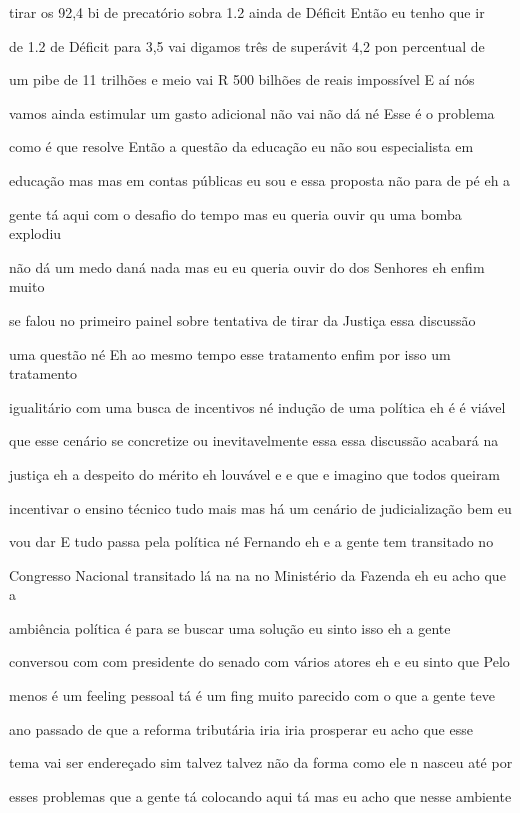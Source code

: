 \documentclass[a4paper,12pt]{article}
\begin{document}
tirar os 92,4 bi de precatório sobra 1.2 ainda de Déficit Então eu tenho que ir

de 1.2 de Déficit para 3,5 vai digamos três de superávit 4,2 pon percentual de

um pibe de 11 trilhões e meio vai R 500 bilhões de reais impossível E aí nós

vamos ainda estimular um gasto adicional não vai não dá né Esse é o problema

como é que resolve Então a questão da educação eu não sou especialista em

educação mas mas em contas públicas eu sou e essa proposta não para de pé eh a

gente tá aqui com o desafio do tempo mas eu queria ouvir qu uma bomba explodiu

não dá um medo daná nada mas eu eu queria ouvir do dos Senhores eh enfim muito

se falou no primeiro painel sobre tentativa de tirar da Justiça essa discussão

uma questão né Eh ao mesmo tempo esse tratamento enfim por isso um tratamento

igualitário com uma busca de incentivos né indução de uma política eh é é viável

que esse cenário se concretize ou inevitavelmente essa essa discussão acabará na

justiça eh a despeito do mérito eh louvável e e que e imagino que todos queiram

incentivar o ensino técnico tudo mais mas há um cenário de judicialização bem eu

vou dar E tudo passa pela política né Fernando eh e a gente tem transitado no

Congresso Nacional transitado lá na na no Ministério da Fazenda eh eu acho que a

ambiência política é para se buscar uma solução eu sinto isso eh a gente

conversou com com presidente do senado com vários atores eh e eu sinto que Pelo

menos é um feeling pessoal tá é um fing muito parecido com o que a gente teve

ano passado de que a reforma tributária iria iria prosperar eu acho que esse

tema vai ser endereçado sim talvez talvez não da forma como ele n nasceu até por

esses problemas que a gente tá colocando aqui tá mas eu acho que nesse ambiente
\end{document}
